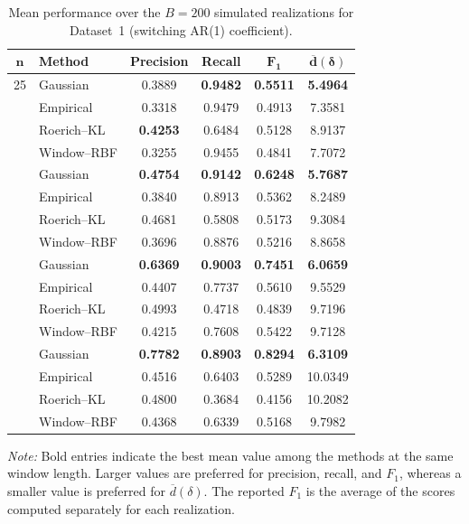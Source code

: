 \begin{table}[!htbp]
    \centering
    \caption{Mean performance over the \(B=200\) simulated realizations for Dataset~1 (switching AR(1) coefficient).}
    \label{tab:mean_metrics_dataset1}
    \small
    \setlength{\tabcolsep}{5pt}
    \renewcommand{\arraystretch}{1.08}
    \begin{tabular}{@{}clcccc@{}}
        \toprule
        \(\boldsymbol{n}\) & \textbf{Method} & \textbf{Precision} & \textbf{Recall} & \(\boldsymbol{F_1}\) & \(\boldsymbol{\overline{d}(\delta)}\) \\
        \midrule
        25 & Gaussian & 0.3889 & \textbf{0.9482} & \textbf{0.5511} & \textbf{5.4964} \\
         & Empirical & 0.3318 & 0.9479 & 0.4913 & 7.3581 \\
         & Roerich--KL & \textbf{0.4253} & 0.6484 & 0.5128 & 8.9137 \\
         & Window--RBF & 0.3255 & 0.9455 & 0.4841 & 7.7072 \\
        \addlinespace[2pt]
        30 & Gaussian & \textbf{0.4754} & \textbf{0.9142} & \textbf{0.6248} & \textbf{5.7687} \\
         & Empirical & 0.3840 & 0.8913 & 0.5362 & 8.2489 \\
         & Roerich--KL & 0.4681 & 0.5808 & 0.5173 & 9.3084 \\
         & Window--RBF & 0.3696 & 0.8876 & 0.5216 & 8.8658 \\
        \addlinespace[2pt]
        40 & Gaussian & \textbf{0.6369} & \textbf{0.9003} & \textbf{0.7451} & \textbf{6.0659} \\
         & Empirical & 0.4407 & 0.7737 & 0.5610 & 9.5529 \\
         & Roerich--KL & 0.4993 & 0.4718 & 0.4839 & 9.7196 \\
         & Window--RBF & 0.4215 & 0.7608 & 0.5422 & 9.7128 \\
        \addlinespace[2pt]
        50 & Gaussian & \textbf{0.7782} & \textbf{0.8903} & \textbf{0.8294} & \textbf{6.3109} \\
         & Empirical & 0.4516 & 0.6403 & 0.5289 & 10.0349 \\
         & Roerich--KL & 0.4800 & 0.3684 & 0.4156 & 10.2082 \\
         & Window--RBF & 0.4368 & 0.6339 & 0.5168 & 9.7982 \\
        \bottomrule
    \end{tabular}
    \begin{flushleft}
        \footnotesize \textit{Note:} Bold entries indicate the best mean value among the methods at the same window length. Larger values are preferred for precision, recall, and \(F_1\), whereas a smaller value is preferred for \(\overline{d}(\delta)\). The reported \(F_1\) is the average of the scores computed separately for each realization.
    \end{flushleft}
\end{table}